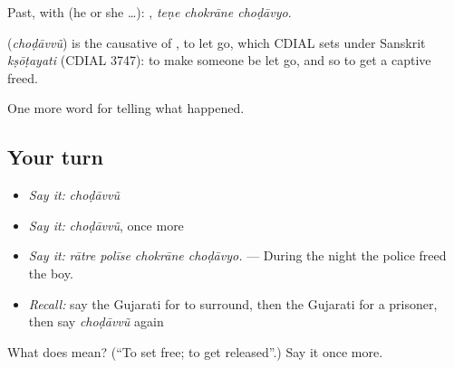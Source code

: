 Past, with  (he or she …):   , \emph{teṇe chokrāne choḍāvyo}.

\begin{cousinweb}
\textbf{} (\emph{choḍāvvũ}) is the causative of \textbf{}, to let go, which CDIAL sets under Sanskrit \emph{kṣōṭayati} (CDIAL 3747): to make someone be let go, and so to get a captive freed.
\end{cousinweb}

\begin{grammarlens}[title={What you've built}]
One more word for telling what happened.
\end{grammarlens}

\subsection*{Your turn}
\begin{itemize}
\raggedright
  \item \emph{Say it:} \emph{choḍāvvũ}
  \item \emph{Say it:} \emph{choḍāvvũ}, once more
  \item \emph{Say it:} \emph{rātre polīse chokrāne choḍāvyo.} — During the night the police freed the boy.
  \item \emph{Recall:} say the Gujarati for to surround, then the Gujarati for a prisoner, then say \emph{choḍāvvũ} again
\end{itemize}

\begin{tcolorbox}[breakable,colback=teal!4,colframe=teal!35!black,title={Before you move on}]
What does  mean? (\textquotedblleft{}To set free; to get released\textquotedblright{}.) Say it once more.
\end{tcolorbox}
